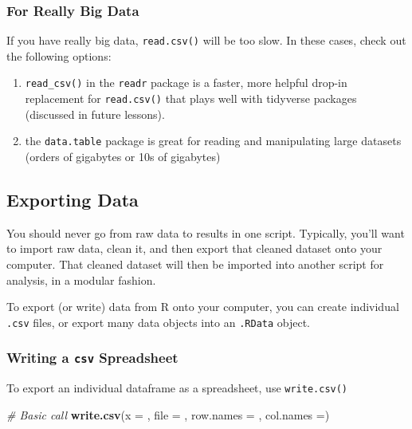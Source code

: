 \documentclass[]{book}
\newenvironment{Shaded}{\begin{snugshade}}{\end{snugshade}}
\newcommand{\CommentTok}[1]{\textcolor[rgb]{0.56,0.35,0.01}{\textit{#1}}}
\newcommand{\DataTypeTok}[1]{\textcolor[rgb]{0.13,0.29,0.53}{#1}}
\newcommand{\KeywordTok}[1]{\textcolor[rgb]{0.13,0.29,0.53}{\textbf{#1}}}
\newcommand{\NormalTok}[1]{#1}
\providecommand{\tightlist}{%
  \setlength{\itemsep}{0pt}\setlength{\parskip}{0pt}}
\begin{document}
\hypertarget{for-really-big-data}{%
\subsubsection*{For Really Big Data}\label{for-really-big-data}}

If you have really big data, \texttt{read.csv()} will be too slow. In these cases, check out the following options:

\begin{enumerate}
\def\labelenumi{\arabic{enumi})}
\tightlist
\item
  \texttt{read\_csv()} in the \texttt{readr} package is a faster, more helpful drop-in replacement for \texttt{read.csv()} that plays well with tidyverse packages (discussed in future lessons).
\item
  the \texttt{data.table} package is great for reading and manipulating large datasets (orders of gigabytes or 10s of gigabytes)
\end{enumerate}

\hypertarget{exporting-data}{%
\subsection{Exporting Data}\label{exporting-data}}

You should never go from raw data to results in one script. Typically, you'll want to import raw data, clean it, and then export that cleaned dataset onto your computer. That cleaned dataset will then be imported into another script for analysis, in a modular fashion.

To export (or write) data from R onto your computer, you can create individual \texttt{.csv} files, or export many data objects into an \texttt{.RData} object.

\hypertarget{writing-a-csv-spreadsheet}{%
\subsubsection*{\texorpdfstring{Writing a \texttt{csv} Spreadsheet}{Writing a csv Spreadsheet}}\label{writing-a-csv-spreadsheet}}

To export an individual dataframe as a spreadsheet, use \texttt{write.csv()}

\begin{Shaded}
\begin{Highlighting}[]
\CommentTok{# Basic call}
\KeywordTok{write.csv}\NormalTok{(}\DataTypeTok{x =}\NormalTok{ , }\DataTypeTok{file =}\NormalTok{ , }\DataTypeTok{row.names =}\NormalTok{ , }\DataTypeTok{col.names =}\NormalTok{)}
\end{Highlighting}
\end{Shaded}
\end{document}
